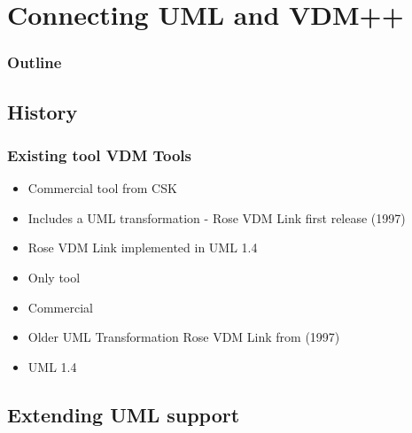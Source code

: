 %
%
\section{Connecting UML and VDM++}
%
%
\begin{frame}
  \frametitle{Outline}
  \tableofcontents[current]
\end{frame}


\subsection{History}
%
%
\frame
{
  \frametitle{Existing tool VDM Tools}
\begin{center}
  \begin{itemize}
  		\item Commercial tool from CSK
  		\item Includes a UML transformation - Rose VDM Link first release (1997)
  		\item Rose VDM Link implemented in UML 1.4
	  	
  \end{itemize}

\end{center}
}


\note
{

  \begin{itemize}
  		\item Only tool
  		\item Commercial
  		\item Older UML Transformation Rose VDM Link from (1997)
  		\item UML 1.4
	  	
  \end{itemize}




}


\subsection{Extending UML support}

